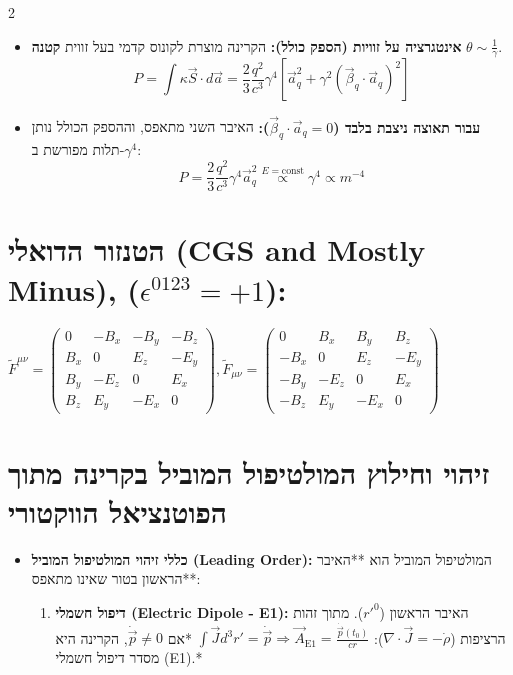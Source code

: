 \documentclass[10pt,a4paper]{article}
\begin{document}
\begin{multicols*}{2}
\begin{itemize}[leftmargin=*]
\begin{itemize}
    \item \textbf{אינטגרציה על זוויות (הספק כולל):} הקרינה מוצרת לקונוס קדמי בעל זווית \textbf{קטנה} $\theta \sim \frac{1}{\gamma}$.
    $$P = \int \kappa \vec{S} \cdot d\vec{a} = \frac{2}{3} \frac{q^2}{c^3} \gamma^4 \left[ \vec{a}_q^2 + \gamma^2 (\vec{\beta}_q \cdot \vec{a}_q)^2 \right]$$
    
    \item \textbf{עבור תאוצה ניצבת בלבד ($\vec{\beta}_q \cdot \vec{a}_q = 0$):}
    האיבר השני מתאפס, וההספק הכולל נותן תלות מפורשת ב-$\gamma^4$:
    $$P = \frac{2}{3} \frac{q^2}{c^3} \gamma^4 \vec{a}_q^2 \overset{E=\text{const}}{\propto} \gamma^4 \propto m^{-4}$$
\end{itemize}

\end{itemize}

\section*{הטנזור הדואלי \textenglish{(CGS and Mostly Minus)}, ($\epsilon^{0123} = +1$):}
    {\scriptsize$
    \tilde{F}^{\mu\nu} = \begin{pmatrix}
    0 & -B_x & -B_y & -B_z \\
    B_x & 0 & E_z & -E_y \\
    B_y & -E_z & 0 & E_x \\
    B_z & E_y & -E_x & 0
    \end{pmatrix}, \tilde{F}_{\mu\nu} = \begin{pmatrix}
    0 & B_x & B_y & B_z \\
    -B_x & 0 & E_z & -E_y \\
    -B_y & -E_z & 0 & E_x \\
    -B_z & E_y & -E_x & 0
    \end{pmatrix}$}
\section{זיהוי וחילוץ המולטיפול המוביל בקרינה מתוך הפוטנציאל הווקטורי}

\begin{itemize}[leftmargin=*]

    \item \textbf{כללי זיהוי המולטיפול המוביל \textenglish{(Leading Order)}:}
    המולטיפול המוביל הוא **האיבר הראשון בטור שאינו מתאפס**:
    \begin{enumerate}
        \item \textbf{דיפול חשמלי \textenglish{(Electric Dipole - E1)}:} האיבר הראשון ($r'^0$). מתוך זהות הרציפות ($\nabla \cdot \vec{J} = -\dot{\rho}$):
        $\int \vec{J} d^3r' = \dot{\vec{p}} \Rightarrow \vec{A}_{\text{E1}} = \frac{\dot{\vec{p}}(t_0)}{c r}$
        *אם $\dot{\vec{p}} \neq 0$, הקרינה היא מסדר דיפול חשמלי \textenglish{(E1)}.*


\end{enumerate}
\end{itemize}
\end{multicols*}
\end{document}
